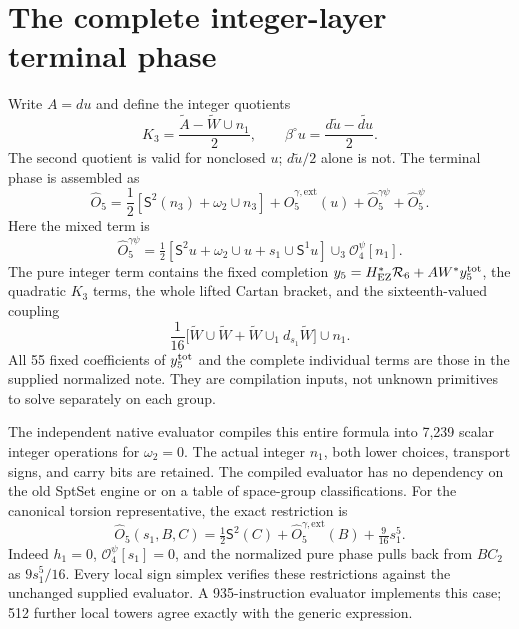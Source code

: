\documentclass[11pt]{article}
\newcommand{\SSq}{\mathsf S}
\newcommand{\dd}{d_{s_1}}
\newcommand{\lift}[1]{\widetilde{#1}}
\begin{document}
\section{The complete integer-layer terminal phase}
Write $A=du$ and define the integer quotients
\begin{equation}
 K_3=\frac{\lift A-\lift W\cup n_1}{2},\qquad
 \beta^\circ u=\frac{d\lift u-\lift{du}}2.
\end{equation}
The second quotient is valid for nonclosed $u$; $d\lift u/2$ alone is not.
The terminal phase is assembled as
\begin{equation}
 \widehat O_5=\frac12[\SSq^2(n_3)+\omega_2\cup n_3]
 +\widehat O_5^{\gamma,\mathrm{ext}}(u)
 +\widehat O_5^{\gamma\psi}+\widehat O_5^\psi.
\end{equation}
Here the mixed term is
\begin{equation}
 \widehat O_5^{\gamma\psi}
 =\tfrac12[\SSq^2u+\omega_2\cup u+s_1\cup\SSq^1u]
 \cup_3\mathcal O_4^\psi[n_1].
\end{equation}
The pure integer term contains the fixed completion
$y_5=H_{\rm EZ}^*\mathcal R_6+AW^*y_5^{\rm tot}$, the quadratic $K_3$
terms, the whole lifted Cartan bracket, and the sixteenth-valued coupling
\begin{equation}
 \frac1{16}\bigl[\lift W\cup\lift W+
 \lift W\cup_1\dd\lift W\bigr]\cup n_1.
\end{equation}
All 55 fixed coefficients of $y_5^{\rm tot}$ and the complete individual
terms are those in the supplied normalized note. They are compilation
inputs, not unknown primitives to solve separately on each group.

The independent native evaluator compiles this entire formula into 7,239
scalar integer operations for $\omega_2=0$. The actual integer $n_1$,
both lower choices, transport signs, and carry bits are retained. The
compiled evaluator has no dependency on the old SptSet engine or on a
table of space-group classifications.
For the canonical torsion representative, the exact restriction is
\begin{equation}
 \widehat O_5(s_1,B,C)=\tfrac12\SSq^2(C)
          +\widehat O_5^{\gamma,\mathrm{ext}}(B)+\tfrac9{16}s_1^5.
\end{equation}
Indeed $h_1=0$, $\mathcal O_4^\psi[s_1]=0$, and the normalized pure phase
pulls back from $BC_2$ as $9s_1^5/16$. Every local sign simplex verifies
these restrictions against the unchanged supplied evaluator. A 935-instruction evaluator implements this case;
512 further local towers agree exactly with the generic expression.
\end{document}
